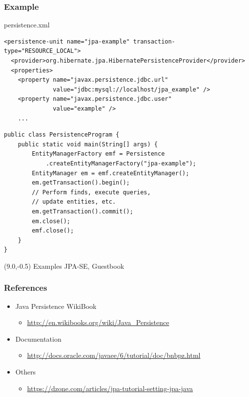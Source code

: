 \documentclass[10pt,xcolor=pdflatex]{beamer}
\begin{document}
\begin{frame}[fragile]\frametitle{Example}
\begin{footnotesize}
persistence.xml
\end{footnotesize}
\lstset{language=XML}
\begin{lstlisting}
<persistence-unit name="jpa-example" transaction-type="RESOURCE_LOCAL">
  <provider>org.hibernate.jpa.HibernatePersistenceProvider</provider>
  <properties>
    <property name="javax.persistence.jdbc.url" 
              value="jdbc:mysql://localhost/jpa_example" />
    <property name="javax.persistence.jdbc.user" 
              value="example" />
    ...
\end{lstlisting}
\lstset{language=Java}
\begin{lstlisting}
public class PersistenceProgram {
    public static void main(String[] args) {
        EntityManagerFactory emf = Persistence
            .createEntityManagerFactory("jpa-example");
        EntityManager em = emf.createEntityManager();
        em.getTransaction().begin();
        // Perform finds, execute queries,
        // update entities, etc.
        em.getTransaction().commit();
        em.close();
        emf.close();
    }
}
\end{lstlisting}
\begin{textblock}{15}(9.0,-0.5)
    {\footnotesize Examples JPA-SE, Guestbook}
\end{textblock}
\end{frame}


\begin{frame}\frametitle{References}
	\begin{itemize}
		\item Java Persistence WikiBook
          \begin{itemize}
        	\item \url{http://en.wikibooks.org/wiki/Java_Persistence}
          \end{itemize}
        \item Documentation
          \begin{itemize}
            \item \url{http://docs.oracle.com/javaee/6/tutorial/doc/bnbpz.html}
          \end{itemize}
        \item Others
          \begin{itemize}
            \item \url{https://dzone.com/articles/jpa-tutorial-setting-jpa-java}
          \end{itemize}
	\end{itemize}
\end{frame}
\end{document}
